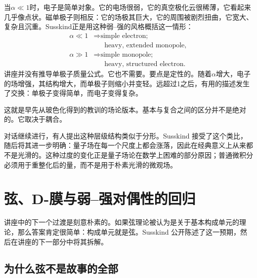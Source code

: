 当\(\alpha\ll 1\)时，电子是简单对象。它的电场很弱，它的真空极化云很稀薄，它看起来几乎像点状。磁单极子则相反：它的场极其巨大，它的周围被剧烈扭曲，它宽大、复杂且沉重。Susskind正是用这种弱--强的风格概括这一情形：
\begin{equation}
\begin{aligned}
\alpha \ll 1
&\Rightarrow \text{simple electron;}\\
&\phantom{\Rightarrow{}}\text{heavy, extended monopole},\\
\alpha \gg 1
&\Rightarrow \text{simple monopole;}\\
&\phantom{\Rightarrow{}}\text{heavy, structured electron}.
\end{aligned}
\end{equation}
讲座并没有推导单极子质量公式。它也不需要。要点是定性的。随着\(\alpha\)增大，电子的场增强，其结构增大，而单极子则缩小并变轻。远超过1之后，有用的描述发生了交换：单极子变得简单，而电子变得复杂。

这就是早先从玻色化得到的教训的场论版本。基本与复合之间的区分并不是绝对的。它取决于耦合。

\begin{classroomqa}
\end{classroomqa}

对话继续进行，有人提出这种层级结构类似于分形。Susskind 接受了这个类比，随后将其进一步明确：量子场在每一个尺度上都会涨落，因此在经典意义上从来都不是光滑的。这种过度的变化正是量子场论在数学上困难的部分原因；普通微积分必须用于重整化后的量，而不是用于朴素光滑的微观场。

\section{弦、D-膜与弱--强对偶性的回归}

讲座中的下一个过渡是刻意朴素的。如果弦理论被认为是关于基本构成单元的理论，那么答案肯定很简单：构成单元就是弦。Susskind 公开陈述了这一预期，然后在讲座的下一部分中将其拆解。

\subsection{为什么弦不是故事的全部}

